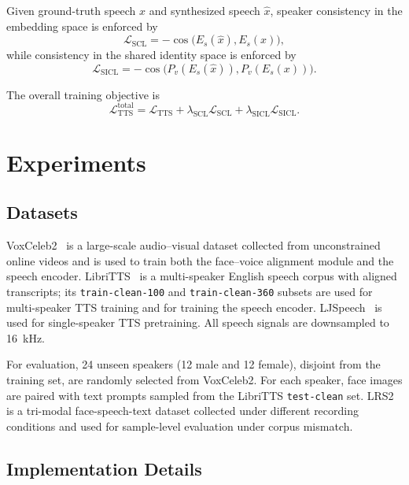 \documentclass[cameraready]{Interspeech}
\begin{document}
Given ground-truth speech $x$ and synthesized speech $\hat{x}$, speaker consistency in the embedding space is enforced by
\begin{equation}
\mathcal{L}_{\mathrm{SCL}} = -\cos\bigl(E_s(\hat{x}), E_s(x)\bigr),
\end{equation}
while consistency in the shared identity space is enforced by
\begin{equation}
\mathcal{L}_{\mathrm{SICL}} = -\cos\bigl(P_v(E_s(\hat{x})), P_v(E_s(x))\bigr).
\end{equation}

The overall training objective is
\begin{equation}
\mathcal{L}_{\mathrm{TTS}}^{\mathrm{total}}
=
\mathcal{L}_{\mathrm{TTS}}
+
\lambda_{\mathrm{SCL}} \mathcal{L}_{\mathrm{SCL}}
+
\lambda_{\mathrm{SICL}} \mathcal{L}_{\mathrm{SICL}} .
\end{equation}

\section{Experiments}

\subsection{Datasets}

VoxCeleb2~\cite{chung18b_interspeech} is a large-scale audio--visual dataset collected from unconstrained online videos and is used to train both the face--voice alignment module and the speech encoder. LibriTTS~\cite{zen19_interspeech} is a multi-speaker English speech corpus with aligned transcripts; its \texttt{train-clean-100} and \texttt{train-clean-360} subsets are used for multi-speaker TTS training and for training the speech encoder. LJSpeech~\cite{ljspeech17} is used for single-speaker TTS pretraining. All speech signals are downsampled to 16~kHz.

For evaluation, 24 unseen speakers (12 male and 12 female), disjoint from the training set, are randomly selected from VoxCeleb2. For each speaker, face images are paired with text prompts sampled from the LibriTTS \texttt{test-clean} set. LRS2~\cite{8099850} is a tri-modal face-speech-text dataset collected under different recording conditions and used for sample-level evaluation under corpus mismatch.

\subsection{Implementation Details}
\end{document}
